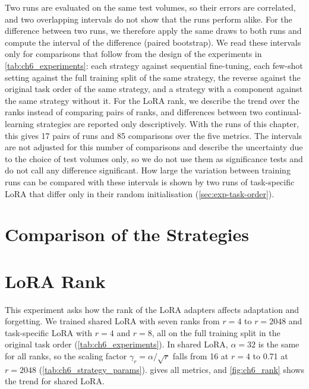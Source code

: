 Two runs are evaluated on the same test volumes, so their errors are correlated, and two overlapping intervals do not show that the runs perform alike.
For the difference between two runs, we therefore apply the same draws to both runs and compute the interval of the difference (paired bootstrap).
We read these intervals only for comparisons that follow from the design of the experiments in \cref{tab:ch6_experiments}: each strategy against sequential fine-tuning, each few-shot setting against the full training split of the same strategy, the reverse against the original task order of the same strategy, and a strategy with a component against the same strategy without it.
For the LoRA rank, we describe the trend over the ranks instead of comparing pairs of ranks, and differences between two continual-learning strategies are reported only descriptively.
With the runs of this chapter, this gives 17 pairs of runs and 85 comparisons over the five metrics.
The intervals are not adjusted for this number of comparisons and describe the uncertainty due to the choice of test volumes only, so we do not use them as significance tests and do not call any difference significant.
How large the variation between training runs can be compared with these intervals is shown by two runs of task-specific LoRA that differ only in their random initialisation (\cref{sec:exp-task-order}).

\section{Comparison of the Strategies}
\label{sec:exp-main}

\section{LoRA Rank}
\label{sec:exp-rank}
This experiment asks how the rank of the LoRA adapters affects adaptation and forgetting.
We trained shared LoRA with seven ranks from $r = 4$ to $r = 2048$ and task-specific LoRA with $r = 4$ and $r = 8$, all on the full training split in the original task order (\cref{tab:ch6_experiments}).
In shared LoRA, $\alpha = 32$ is the same for all ranks, so the scaling factor $\gamma_r = \alpha / \sqrt{r}$ falls from 16 at $r = 4$ to 0.71 at $r = 2048$ (\cref{tab:ch6_strategy_params}).
 gives all metrics, and \cref{fig:ch6_rank} shows the trend for shared LoRA.

